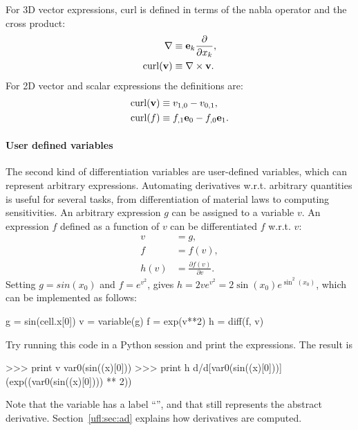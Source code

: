 For 3D vector expressions, curl is defined in terms
of the nabla operator and the cross product:
\begin{align}
  \nabla &\equiv \mathbf{e}_k \frac{\partial}{\partial x_k}, \\
  \operatorname{curl}(\mathbf{v}) &\equiv \nabla \times \mathbf{v}.
\end{align}
For 2D vector and scalar expressions the definitions are:
\begin{align}
  \operatorname{curl}(\mathbf{v}) &\equiv v_{1,0} - v_{0,1}, \\
  \operatorname{curl}(f)   &\equiv f_{,1}\mathbf{e}_0 - f_{,0}\mathbf{e}_1.
\end{align}

\paragraph{User defined variables}
\label{ufl:sec:diff}

The second kind of differentiation variables are user-defined
variables, which can represent arbitrary expressions.  Automating
derivatives w.r.t. arbitrary quantities is useful for several tasks,
from differentiation of material laws to computing sensitivities.  An
arbitrary expression $g$ can be assigned to a variable $v$.  An
expression $f$ defined as a function of $v$ can be differentiated $f$
w.r.t. $v$:
\begin{align}
v &= g, \\
f &= f(v), \\
h(v) &= \frac{\partial f(v)}{\partial v}.
\end{align}
Setting $g = sin(x_0)$ and $f = e^{v^2}$, gives $h = 2 v e^{v^2} = 2
\sin(x_0) e^{\sin^2(x_0)}$, which can be implemented as follows:
\begin{python}
g = sin(cell.x[0])
v = variable(g)
f = exp(v**2)
h = diff(f, v)
\end{python}
Try running this code in a Python session and print the expressions.
The result is
\begin{python}
>>> print v
var0(sin((x)[0]))
>>> print h
d/d[var0(sin((x)[0]))] (exp((var0(sin((x)[0]))) ** 2))
\end{python}
Note that the variable has a label ``'', and that 
still represents the abstract derivative.  Section~\ref{ufl:sec:ad}
explains how derivatives are computed.

